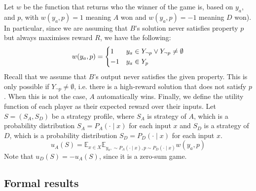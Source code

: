 Let $w$ be the function that returns who the winner of the game is, based on $y_a$, and $p$, with $w(y_a, p) = 1$ meaning $A$ won and $w(y_a, p) = -1$ meaning $D$ won). In particular, since we are assuming that $B$'s solution never satisfies property $p$ but always maximises reward $R$, we have the following: %
\begin{equation} \label{eq:w}
w(y_a,  p) =
    \begin{dcases}
        1  & y_a \in Y_{\neg p} \vee Y_{\neg p} \ne \emptyset \\
        -1 & y_a \in Y_{ p}     \\
    \end{dcases}
\end{equation}
Recall that we assume that $B$'s output never satisfies the given property. This is only possible if $Y_{\neg p} \ne \emptyset$, i.e. there is a high-reward solution that does not satisfy $p$. When this is not the case, $A$ automatically wins.
Finally, we define the utility function of each player as their expected reward over their inputs. Let $S = (S_A, S_D)$ be a strategy profile, where $S_A$ is strategy of $A$, which is a probability distribution $S_A = P_A(\cdot \mid x)$ for each input $x$ and $S_D$ is a strategy of $D$, which is a probability distribution $S_D = P_D(\cdot \mid x)$ for each input $x$.%
\begin{equation} \label{eq:uA}
u_A(S) = \mathbb{E}_{x \in X} \mathbb{E}_{y_a, \sim P_A(\cdot \mid x), p \sim P_D(\cdot \mid x)}w(y_a, p)
\end{equation}
Note that $u_D(S) = - u_A(S)$, since it is a zero-sum game.

\subsection{Formal results}

